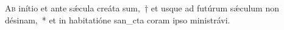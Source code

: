 \lettrine{A}{b} inítio et ante sǽcula creáta sum,~† et usque ad futúrum sǽculum non désinam,~* et in habitatióne  san\_cta coram i\-pso ministrávi.